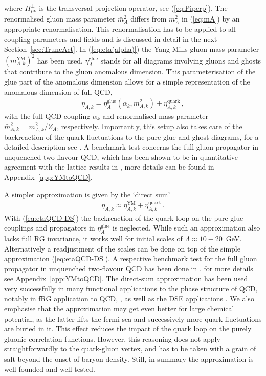 \documentclass[%
reprint,
superscriptaddress,
showpacs,preprintnumbers,
 amsmath,amssymb,
 aps,
prd,
]{revtex4-1}
\def\eq#1{(\ref{#1})}
\def\sec#1{Section~\ref{#1}}
\def\app#1{Appendix~\ref{#1}}
\begin{document}
where $\Pi_{\mu\nu}^{\perp}$ is the transversal projection operator,
see \eq{eq:Piperp}. The renormalised gluon mass parameter $\bar m_A^2$
differs from $m_A^2$ in \eq{eq:mA} by an appropriate renormalisation.
This renormalisation has to be applied to all coupling parameters and
fields and is discussed in detail in the next
\sec{sec:TruncAct}. In \eq{eq:eta(alpha)} the Yang-Mills gluon
mass parameter $(\bar m^{\textrm{YM}}_{A,k})^2$ has been
used. $\eta_A^{\textrm{glue}}$ stands for all diagrams involving
gluons and ghosts that contribute to the gluon anomalous dimension.
This parameterisation of the glue part of the anomalous dimension
allows for a simple representation of the anomalous dimension of full
QCD,
%
\begin{align}\label{eq:etaQCD}
  \eta_{A,k}= \eta_A^{\textrm{glue}}(\alpha_k, \bar m_{A,k}^2)
  +\eta^\textrm{quark}_{A,k}\,, 
\end{align}
%
with the full QCD coupling $\alpha_k$ and renormalised mass parameter
$\bar m_{A,k}^2= m_{A,k}^2/Z_A$, respectively.  Importantly, this
setup also takes care of the backreaction of the quark fluctuations to
the pure glue and ghost diagrams, for a detailed description see
\cite{Braun:2014ata, Rennecke:2015}. A benchmark test concerns the
full gluon propagator in unquenched two-flavour QCD, which has been
shown to be in quantitative agreement with the lattice results in
\cite{Rennecke:2015}, more details can be found in \app{app:YMtoQCD}.

A simpler approximation is given by the `direct sum'
%
\begin{align}\label{eq:etaQCD-DS}
  \eta_{A,k}\approx  \eta_{A,k}^{\textrm{YM}}
  + \eta^\textrm{quark}_{A,k}\,.  
\end{align}
With \eq{eq:etaQCD-DS} the backreaction of the quark loop on the pure
glue couplings and propagators in $\eta_A^{\textrm{glue}}$ is
neglected.  While such an approximation also lacks full RG invariance,
it works well for initial scales of $\Lambda\approx 10 -20 $\, GeV.
Alternatively a readjustment of the scales can be done on top of the
simple approximation \eq{eq:etaQCD-DS}. A respective benchmark test
for the full gluon propagator in unquenched two-flavour QCD has been
done in \cite{Rennecke:2015}, for more details see
\app{app:YMtoQCD}. The direct-sum approximation has been used very
successfully in many functional applications to the phase structure of
QCD, notably in fRG application to QCD, \cite{Braun:2009gm}, as well
as the DSE applications \cite{Fischer:2011mz, Fischer:2012vc,
  Fischer:2013eca, Fischer:2014ata, Fischer:2014vxa, Eichmann:2015kfa,
  Mitter:2017iye, Fischer:2018sdj, Isserstedt:2019pgx,
  Gunkel:2019xnh}.  We also emphasise that the approximation may get
even better for large chemical potential, as the latter lifts the
fermi sea and successively more quark fluctuations are buried in
it. This effect reduces the impact of the quark loop on the purely
gluonic correlation functions.  However, this reasoning does not apply
straightforwardly to the quark-gluon vertex, and has to be taken with
a grain of salt beyond the onset of baryon density. Still, in summary
the approximation is well-founded and well-tested.
\end{document}
